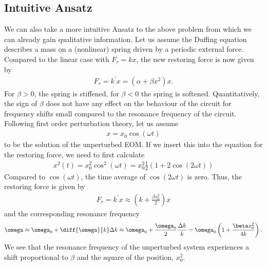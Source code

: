 \subsection{Intuitive Ansatz}
We can also take a more intuitive Ansatz to the above problem from which we can already gain qualitative information.
Let us assume the Duffing equation describes a mass on a (nonlinear) spring driven by a periodic external force.
Compared to the linear case with $F_r=kx$, the new restoring force is now given by 
\begin{align}
F_r = k^\prime x = (\alpha +\beta x^2)x.
\end{align}
For $\beta>0$, the spring is stiffened, for $\beta<0$ the spring is softened.
Quantitatively, the sign of $\beta$ does not have any effect on the behaviour of the circuit for frequency shifts small compared to the resonance frequency of the circuit.
Following first order perturbation theory, let us assume 
\begin{align}
x=x_0 \cos(\omega t)%
\end{align}
to be the solution of the unperturbed EOM.
If we insert this into the equation for the restoring force, we need to first calculate
\begin{align}
x^2(t) = x_0^2\cos^2(\omega t) = x_0^2\frac{1}{2}(1+2\cos(2\omega t))
\end{align}
Compared to $\cos(\omega t)$, the time average of $\cos(2\omega t)$ is zero.
Thus, the restoring force is given by
\begin{align}
F_r=k^\prime x \approx \left(k+\frac{\beta x_0^2}{2}\right)x
\end{align}
and the corresponding resonance frequency
\begin{align}
\omega \approx \omega_0 + \diff{\omega}{k}\Delta k \approx \omega_0 + \frac{\omega_0}{2}\frac{\Delta k}{k} = \omega_0 \left(1+\frac{\beta x_0^2}{4k}\right).
\end{align}
We see that the resonance frequency of the unperturbed system experiences a shift proportional to $\beta$ and the square of the position, $x_0^2$.

%